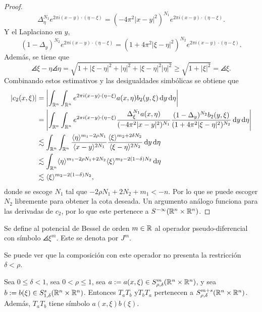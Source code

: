 \begin{proof}
	\begin{equation*}
		\Delta_\eta^{N_1} e^{2\pi i(x-y)\cdot(\eta-\xi)} = 
		(- 4\pi^2|x-y|^2)^{N_1}  e^{2\pi i(x-y)\cdot(\eta-\xi)}.
	\end{equation*}
	Y el Laplaciano en $y$,
	\begin{equation*}
		(1-\Delta_y)^{N_2} e^{2\pi i(x-y)\cdot(\eta-\xi)}  = 
		(1+4\pi^2|\xi-\eta|^2)^{N_2} e^{2\pi i(x-y)\cdot(\eta-\xi)}.
	\end{equation*}
	Además, se tiene que 
	\begin{equation*}
		\angles{\xi-\eta}\angles{\eta} = \sqrt{1 + |\xi-\eta|^2 + |\eta|^2 + |\xi-\eta|^2|\eta|^2} \geq \sqrt{1 + |\xi|^2} = \angles{\xi}.
	\end{equation*}
	Combinando estos estimativos y las desigualdades simbólicas se obtiene que
	\begin{align*}
		|c_2(x, \xi)| & = \left| \int_{\mathbb{R}^n}\int_{\mathbb{R}^n} 
		e^{2\pi i(x-y)\cdot(\eta-\xi)} a(x, \eta)b_2(y, \xi)\mathop{}\!\mathrm{d} y \mathop{}\!\mathrm{d} \eta \right| \\
		&  = \left| \int_{\mathbb{R}^n}\int_{\mathbb{R}^n} 
		e^{2\pi i(x-y)\cdot(\eta-\xi)} \frac{\Delta_\xi^{N_1}a(x, \eta)}{(-4\pi^2|x-y|^2)^{N_1}} \frac{(1-\Delta_y)^{N_2}b_2(y, \xi)}{(1+4\pi^2|\xi-\eta|^2)^{N_2}}\mathop{}\!\mathrm{d} y \mathop{}\!\mathrm{d} \eta \right|  \\
		& \lesssim \int_{\mathbb{R}^n}\int_{\mathbb{R}^n}  \frac{\langle\eta\rangle^{m_1-2\rho N_1}}{\langle x-y\rangle^{2N_1}} \frac{\langle\xi\rangle^{m_2 + 2\delta N_2}}{\langle\xi-\eta\rangle^{2N_2}} \mathop{}\!\mathrm{d} y \mathop{}\!\mathrm{d} \eta \\
		& \lesssim \int_{\mathbb{R}^n} \langle\eta\rangle^{m_1-2\rho N_1 + 2N_2} \langle\xi\rangle^{m_2-2(1-\delta) N_2 } \mathop{}\!\mathrm{d} \eta \\
		& \lesssim \langle\xi\rangle^{m_2-2(1-\delta) N_2 }, \\
	\end{align*}
	donde se escoge $N_1$ tal que $-2\rho N_1 + 2N_2 + m_1 < -n$. Por lo que se puede escoger $N_2$ libremente para obtener la cota deseada. Un argumento análogo funciona para las derivadas de $c_2$, por lo que este pertenece a $S^{-\infty}(\mathbb{R}^n\times\mathbb{R}^n)$.
\end{proof}
\begin{definition}
	Se define al potencial de Bessel de orden $m\in\mathbb{R}$ al operador pseudo-diferencial con símbolo $\angles{\xi}^m$. Este se denota por $J^m$.
\end{definition}
Se puede ver que la composición con este operador no presenta la restricción $\delta<\rho$.
\begin{theorem}
	Sea $0\leq\delta<1$, sea $0<\rho\leq1$, sea $a:=a(x, \xi)\in S^m_{\rho,\delta}(\mathbb{R}^n\times\mathbb{R}^n)$, y sea $b:=b(\xi) \in S^s_{1,\delta}(\mathbb{R}^n\times\mathbb{R}^n)$. Entonces $T_aT_b$ y$T_bT_a$ pertenecen a $S^{m+s}_{\rho,\delta}(\mathbb{R}^n\times\mathbb{R}^n)$. Además, $T_aT_b$ tiene símbolo $a(x, \xi)b(\xi)$.
\end{theorem}
